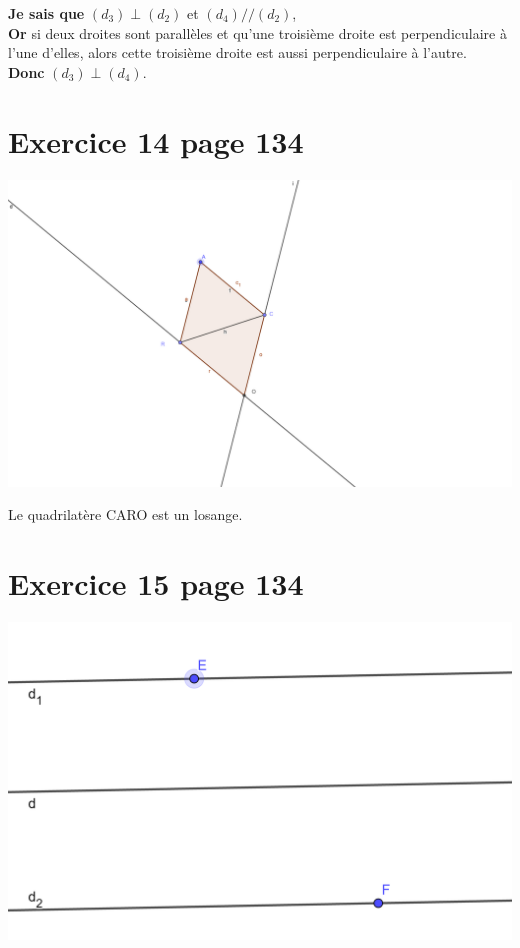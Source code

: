 \documentclass[12pt,a4paper]{article}
\begin{document}
\noindent \textbf{Je sais que} $(d_3) \perp (d_2)$ et $(d_4) // (d_2)$,\\
\textbf{Or} si deux droites sont parallèles et qu'une troisième droite est perpendiculaire à l'une d'elles, alors cette troisième droite est aussi perpendiculaire à l'autre.\\
\textbf{Donc} $(d_3) \perp (d_4)$.


\section*{Exercice 14 page 134}


\begin{center}
	\includegraphics[scale=0.15]{ex14_p134}
\end{center}

Le quadrilatère CARO est un losange.

\section*{Exercice 15 page 134}

\begin{center}
	\includegraphics[scale=0.15]{ex15_p134}
\end{center}
\end{document}
